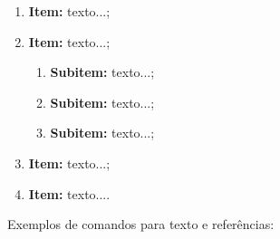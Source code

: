      \begin{enumerate}
     	\item \textbf{Item:} texto...;
     	\item \textbf{Item:} texto...;
     	\begin{enumerate}
     		\item \textbf{Subitem:} texto...;
     		\item \textbf{Subitem:} texto...;
     		\item \textbf{Subitem:} texto...;
     	\end{enumerate}
     	\item \textbf{Item:} texto...;
     	\item \textbf{Item:} texto....
     \end{enumerate}
     
     
     Exemplos de comandos para texto e referências:
     
